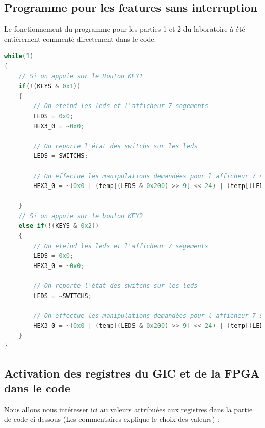 \subsection{Programme pour les features sans interruption}
Le fonctionnement du programme pour les parties 1 et 2 du laboratoire à été entièrement commenté directement dans le code. \\
\begin{lstlisting}[language=C]
    while(1)
{
	// Si on appuie sur le Bouton KEY1
	if(!(KEYS & 0x1))
	{
		// On eteind les leds et l'afficheur 7 segements
		LEDS = 0x0;
		HEX3_0 = ~0x0;
		
		// On reporte l'état des switchs sur les leds
		LEDS = SWITCHS;
		
		// On effectue les manipulations demandées pour l'afficheur 7 segements pour KEY1
		HEX3_0 = ~(0x0 | (temp[(LEDS & 0x200) >> 9] << 24) | (temp[(LEDS & 0x100) >> 8] << 16) | (temp[(LEDS & 0xF0) >> 4 ] << 8) | (temp[(LEDS & 0xF)]));
	
	}
	// Si on appuie sur le bouton KEY2
	else if(!(KEYS & 0x2))
	{
		// On eteind les leds et l'afficheur 7 segements
		LEDS = 0x0;
		HEX3_0 = ~0x0;
		
		// On reporte l'état des switchs sur les leds
		LEDS = ~SWITCHS;
		
		// On effectue les manipulations demandées pour l'afficheur 7 segements pour KEY2
		HEX3_0 = ~(0x0 | (temp[(LEDS & 0x200) >> 9] << 24) | (temp[(LEDS & 0x100) >> 8] << 16) | (temp[(LEDS & 0xF0) >> 4 ] << 8) | (temp[(LEDS & 0xF)]));
	}
}
\end{lstlisting}

\subsection{Activation des registres du GIC et de la FPGA dans le code }
Nous allons nous intéresser ici au valeurs attribuées aux registres dans la partie de code ci-dessous (Les commentaires explique le choix des valeurs) : \\

